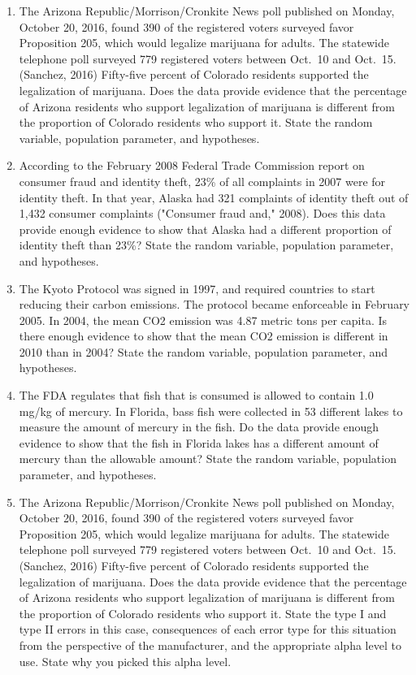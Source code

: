 \documentclass[]{book}
\begin{document}
\begin{enumerate}
\def\labelenumi{\arabic{enumi}.}
\item
  The Arizona Republic/Morrison/Cronkite News poll published on Monday, October 20, 2016, found 390 of the registered voters surveyed favor Proposition 205, which would legalize marijuana for adults. The statewide telephone poll surveyed 779 registered voters between Oct.~10 and Oct.~15. (Sanchez, 2016) Fifty-five percent of Colorado residents supported the legalization of marijuana. Does the data provide evidence that the percentage of Arizona residents who support legalization of marijuana is different from the proportion of Colorado residents who support it. State the random variable, population parameter, and hypotheses.
\item
  According to the February 2008 Federal Trade Commission report on consumer fraud and identity theft, 23\% of all complaints in 2007 were for identity theft. In that year, Alaska had 321 complaints of identity theft out of 1,432 consumer complaints ("Consumer fraud and," 2008). Does this data provide enough evidence to show that Alaska had a different proportion of identity theft than 23\%? State the random variable, population parameter, and hypotheses.
\item
  The Kyoto Protocol was signed in 1997, and required countries to start reducing their carbon emissions. The protocol became enforceable in February 2005. In 2004, the mean CO2 emission was 4.87 metric tons per capita. Is there enough evidence to show that the mean CO2 emission is different in 2010 than in 2004? State the random variable, population parameter, and hypotheses.
\item
  The FDA regulates that fish that is consumed is allowed to contain 1.0 mg/kg of mercury. In Florida, bass fish were collected in 53 different lakes to measure the amount of mercury in the fish. Do the data provide enough evidence to show that the fish in Florida lakes has a different amount of mercury than the allowable amount? State the random variable, population parameter, and hypotheses.
\item
  The Arizona Republic/Morrison/Cronkite News poll published on Monday, October 20, 2016, found 390 of the registered voters surveyed favor Proposition 205, which would legalize marijuana for adults. The statewide telephone poll surveyed 779 registered voters between Oct.~10 and Oct.~15. (Sanchez, 2016) Fifty-five percent of Colorado residents supported the legalization of marijuana. Does the data provide evidence that the percentage of Arizona residents who support legalization of marijuana is different from the proportion of Colorado residents who support it. State the type I and type II errors in this case, consequences of each error type for this situation from the perspective of the manufacturer, and the appropriate alpha level to use. State why you picked this alpha level.

\end{enumerate}
\end{document}
